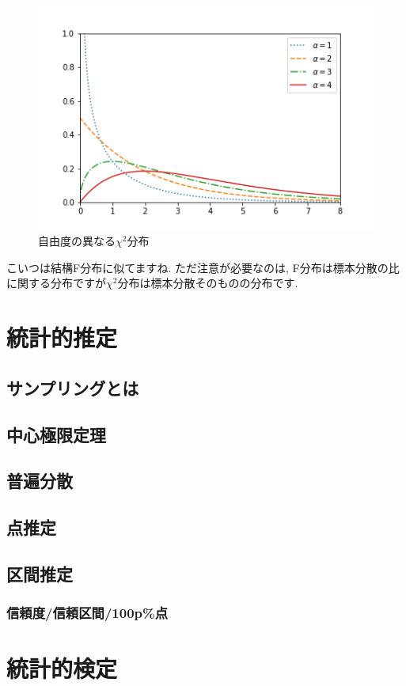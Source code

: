 \documentclass[11pt,a4paper]{jsarticle}                    %
\begin{document}
\begin{figure}[H]
\label{im:chi}
  \centering
  \includegraphics[width=120mm,bb=0 0 432 288]{../figures/kai.png}
  \caption{自由度の異なる$\chi^2$分布}
\end{figure}
 こいつは結構F分布に似てますね. ただ注意が必要なのは, F分布は標本分散の比に関する分布ですが$\chi^2$分布は標本分散そのものの分布です.

\newpage
\section{統計的推定}

\subsection{サンプリングとは}
\subsection{中心極限定理}
\subsection{普遍分散}
\subsection{点推定}
\subsection{区間推定}
\subsubsection{信頼度/信頼区間/100p\%点}

\section{統計的検定}
\end{document}
